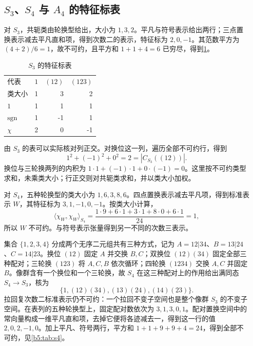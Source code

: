 \subsection{\texorpdfstring{\(S_3\)、\(S_4\) 与 \(A_4\) 的特征标表}{S3、S4 与 A4 的特征标表}}
\label{b5:subsec:0204:02}

对 \(S_3\)，共轭类由轮换型给出，大小为 \(1,3,2\)。平凡与符号表示给出两行；三点置换表示减去平凡直和项，得到次数二的表示，特征标为 \(2,0,-1\)。其范数平方为 \((4+2)/6=1\)，故不可约，且平方和 \(1+1+4=6\) 已穷尽，得到\cref{b5:tab:s3}。

\begin{table}[htbp]
	\centering
	\caption{\(S_3\) 的特征标表}\label{b5:tab:s3}
	\begin{tabular}{lrrr}
		\toprule
		代表&\(1\)&\((12)\)&\((123)\)\\
		类大小&1&3&2\\
		\midrule
		\(1\)&1&1&1\\
		\(\mathrm{sgn}\)&1&-1&1\\
		\(\chi\)&2&0&-1\\
		\bottomrule
	\end{tabular}
\end{table}

由 \(S_3\) 的表可以实际核对列正交。对换位这一列，遍历全部不可约行，得到
\[
	1^2+(-1)^2+0^2=2=|C_{S_3}((12))|.
\]
换位与三轮换两列的内积为 \(1\cdot1+(-1)\cdot1+0\cdot(-1)=0\)。这里按不可约类型求和，未乘类大小；行正交则对共轭类求和，并以类大小加权。

\ProseParagraphBreak
对 \(S_4\)，五种轮换型的类大小为 \(1,6,3,8,6\)。四点置换表示减去平凡项，得到标准表示 \(W\)，其特征标为 \(3,1,-1,0,-1\)。按类大小计算，
\[
	\langle\chi_W,\chi_W\rangle_{S_4} =\frac{1\cdot9+6\cdot1+3\cdot1+8\cdot0+6\cdot1}{24}=1,
\]
所以 \(W\) 不可约。与符号表示张量得到另一不同的次数三表示。

\ProseParagraphBreak
集合 \(\{1,2,3,4\}\) 分成两个无序二元组共有三种方式，记为 \(A=12|34\)、\(B=13|24\)、\(C=14|23\)。换位 \((12)\) 固定 \(A\) 并交换 \(B,C\)；双换位 \((12)(34)\) 固定全部三种配对；三轮换 \((123)\) 将 \(A,C,B\) 依次循环；四轮换 \((1234)\) 交换 \(A,C\) 并固定 \(B\)。像群含有一个换位和一个三轮换，故 \(S_4\) 在这三种配对上的作用给出满同态 \(S_4\to S_3\)，核为
\[
	\bigl\{1,(12)(34),(13)(24),(14)(23)\bigr\}.
\]
拉回复次数二标准表示仍不可约：一个拉回不变子空间也是整个像群 \(S_3\) 的不变子空间。在表列的五种轮换型上，固定配对数依次为 \(3,1,3,0,1\)。配对置换空间中的常向量构成一维平凡直和项，去掉它便将各迹减去一，得到这一行的值 \(2,0,2,-1,0\)。加上平凡、符号两行，平方和 \(1+1+9+9+4=24\)，得到全部不可约，见\cref{b5:tab:s4}。

